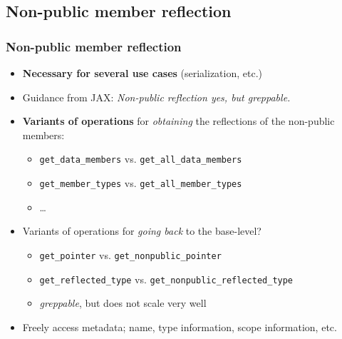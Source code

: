 \documentclass[compress,table,xcolor=table]{beamer}
\begin{document}
\subsection{Non-public member reflection}
\begin{frame}[fragile]
\frametitle{Non-public member reflection}
  \begin{itemize}
    \item \textbf{Necessary for several use cases} (serialization, etc.)
    \item Guidance from JAX: {\em Non-public reflection yes, but {\em greppable}.}
    \item \textbf{Variants of operations} for {\em obtaining} the reflections
      of the non-public members:
    \begin{itemize}
      \footnotesize
      \item \texttt{get\_data\_members} vs. \texttt{\alert{get\_all\_data\_members}}
      \item \texttt{get\_member\_types} vs. \texttt{\alert{get\_all\_member\_types}}
      \item \ldots
    \end{itemize}
    \item Variants of operations for {\em going back} to the base-level?
    \begin{itemize}
      \footnotesize
      \item \texttt{get\_pointer} vs. \texttt{\alert{get\_nonpublic\_pointer}}
      \item \texttt{get\_reflected\_type} vs. \texttt{\alert{get\_nonpublic\_reflected\_type}}
      \item {\em greppable}, but does not scale very well
    \end{itemize}
    \item Freely access metadata; name, type information, scope information, etc.
  \end{itemize}
\end{frame}
\end{document}
